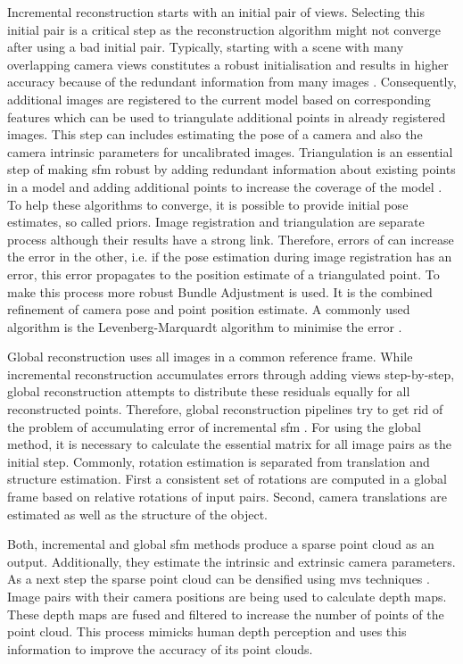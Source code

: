 Incremental reconstruction starts with an initial pair of views. Selecting this initial pair is a critical step as the reconstruction algorithm might not converge after using a bad initial pair. Typically, starting with a scene with many overlapping camera views constitutes a robust initialisation and results in higher accuracy because of the redundant information from many images \cite{schonberger2016structure}.
Consequently, additional images are registered to the current model based on corresponding features which can be used to triangulate additional points in already registered images. This step can includes estimating the pose of a camera and also the camera intrinsic parameters for uncalibrated images. Triangulation is an essential step of making \gls{sfm} robust by adding redundant information about existing points in a model and adding additional points to increase the coverage of the model \cite{schonberger2016structure}. To help these algorithms to converge, it is possible to provide initial pose estimates, so called priors.
Image registration and triangulation are separate process although their results have a strong link. Therefore, errors of can increase the error in the other, i.e. if the pose estimation during image registration has an error, this error propagates to the position estimate of a triangulated point. To make this process more robust Bundle Adjustment is used. It is the combined refinement of camera pose and point position estimate. A commonly used algorithm is the Levenberg-Marquardt algorithm to minimise the error \cite{schonberger2016structure, moulon2012adaptive}.

Global reconstruction uses all images in a common reference frame. While incremental reconstruction accumulates errors through adding views step-by-step, global reconstruction attempts to distribute these residuals equally for all reconstructed points. Therefore, global reconstruction pipelines try to get rid of the problem of accumulating error of incremental \gls{sfm} \cite{Moulon_2013_ICCV}.
For using the global method, it is necessary to calculate the essential matrix for all image pairs as the initial step. Commonly, rotation estimation is separated from translation and structure estimation. First a consistent set of rotations are computed in a global frame based on relative rotations of input pairs. Second, camera translations are estimated as well as the structure of the object.

Both, incremental and global \gls{sfm} methods produce a sparse point cloud as an output. Additionally, they estimate the intrinsic and extrinsic camera parameters. As a next step the sparse point cloud can be densified using \gls{mvs} techniques \cite{pagani2011dense}. Image pairs with their camera positions are being used to calculate depth maps. These depth maps are fused and filtered to increase the number of points of the point cloud. This process mimicks human depth perception and uses this information to improve the accuracy of its point clouds.

